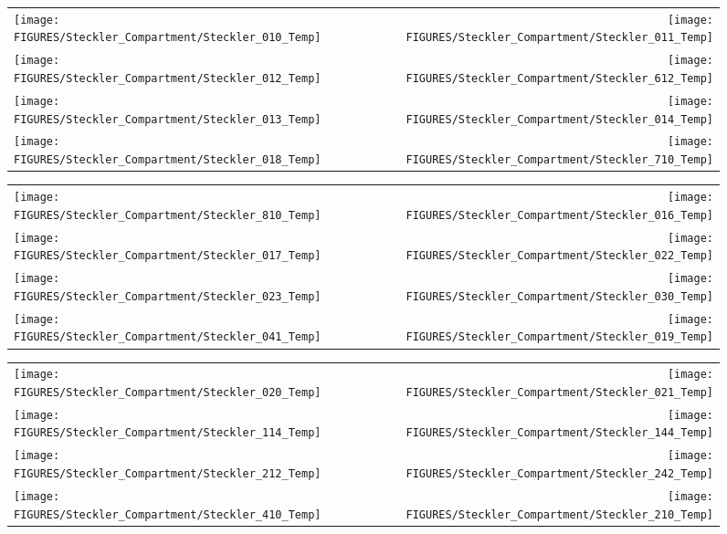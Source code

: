 \begin{figure}[p]
\begin{tabular*}{\textwidth}{l@{\extracolsep{\fill}}r}
\texttt{[image: FIGURES/Steckler\_Compartment/Steckler\_010\_Temp]} &
\texttt{[image: FIGURES/Steckler\_Compartment/Steckler\_011\_Temp]} \\
\texttt{[image: FIGURES/Steckler\_Compartment/Steckler\_012\_Temp]} &
\texttt{[image: FIGURES/Steckler\_Compartment/Steckler\_612\_Temp]} \\
\texttt{[image: FIGURES/Steckler\_Compartment/Steckler\_013\_Temp]} &
\texttt{[image: FIGURES/Steckler\_Compartment/Steckler\_014\_Temp]} \\
\texttt{[image: FIGURES/Steckler\_Compartment/Steckler\_018\_Temp]} &
\texttt{[image: FIGURES/Steckler\_Compartment/Steckler\_710\_Temp]}
\end{tabular*}
\label{Steckler_Temp_1}
\end{figure}

\begin{figure}[p]
\begin{tabular*}{\textwidth}{l@{\extracolsep{\fill}}r}
\texttt{[image: FIGURES/Steckler\_Compartment/Steckler\_810\_Temp]} &
\texttt{[image: FIGURES/Steckler\_Compartment/Steckler\_016\_Temp]} \\
\texttt{[image: FIGURES/Steckler\_Compartment/Steckler\_017\_Temp]} &
\texttt{[image: FIGURES/Steckler\_Compartment/Steckler\_022\_Temp]} \\
\texttt{[image: FIGURES/Steckler\_Compartment/Steckler\_023\_Temp]} &
\texttt{[image: FIGURES/Steckler\_Compartment/Steckler\_030\_Temp]} \\
\texttt{[image: FIGURES/Steckler\_Compartment/Steckler\_041\_Temp]} &
\texttt{[image: FIGURES/Steckler\_Compartment/Steckler\_019\_Temp]}
\end{tabular*}
\label{Steckler_Temp_2}
\end{figure}

\begin{figure}[p]
\begin{tabular*}{\textwidth}{l@{\extracolsep{\fill}}r}
\texttt{[image: FIGURES/Steckler\_Compartment/Steckler\_020\_Temp]} &
\texttt{[image: FIGURES/Steckler\_Compartment/Steckler\_021\_Temp]} \\
\texttt{[image: FIGURES/Steckler\_Compartment/Steckler\_114\_Temp]} &
\texttt{[image: FIGURES/Steckler\_Compartment/Steckler\_144\_Temp]} \\
\texttt{[image: FIGURES/Steckler\_Compartment/Steckler\_212\_Temp]} &
\texttt{[image: FIGURES/Steckler\_Compartment/Steckler\_242\_Temp]} \\
\texttt{[image: FIGURES/Steckler\_Compartment/Steckler\_410\_Temp]} &
\texttt{[image: FIGURES/Steckler\_Compartment/Steckler\_210\_Temp]}
\end{tabular*}
\label{Steckler_Temp_3}
\end{figure}

